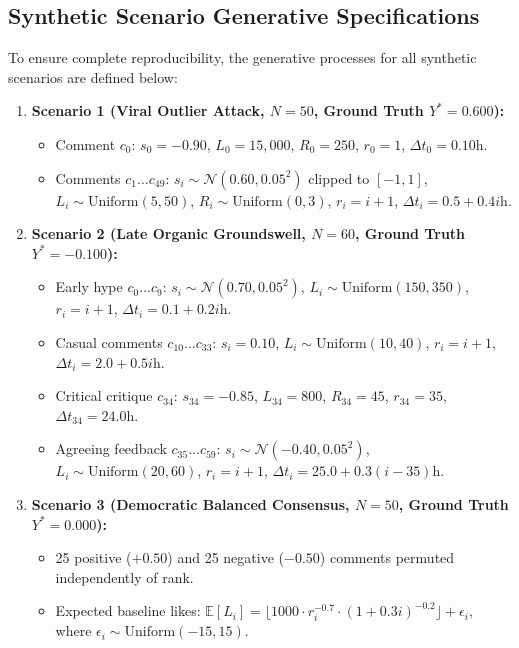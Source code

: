 \documentclass[journal]{IEEEtran}
\begin{document}
\subsection{Synthetic Scenario Generative Specifications}
To ensure complete reproducibility, the generative processes for all synthetic scenarios are defined below:
\begin{enumerate}
    \item \textbf{Scenario 1 (Viral Outlier Attack, $N = 50$, Ground Truth $Y^* = 0.600$):}
    \begin{itemize}
        \item Comment $c_0$: $s_0 = -0.90$, $L_0 = 15,000$, $R_0 = 250$, $r_0 = 1$, $\Delta t_0 = 0.10\text{h}$.
        \item Comments $c_1 \dots c_{49}$: $s_i \sim \mathcal{N}(0.60, 0.05^2)$ clipped to $[-1, 1]$, $L_i \sim \text{Uniform}(5, 50)$, $R_i \sim \text{Uniform}(0, 3)$, $r_i = i + 1$, $\Delta t_i = 0.5 + 0.4i\text{h}$.
    \end{itemize}
    \item \textbf{Scenario 2 (Late Organic Groundswell, $N = 60$, Ground Truth $Y^* = -0.100$):}
    \begin{itemize}
        \item Early hype $c_0 \dots c_9$: $s_i \sim \mathcal{N}(0.70, 0.05^2)$, $L_i \sim \text{Uniform}(150, 350)$, $r_i = i + 1$, $\Delta t_i = 0.1 + 0.2i\text{h}$.
        \item Casual comments $c_{10} \dots c_{33}$: $s_i = 0.10$, $L_i \sim \text{Uniform}(10, 40)$, $r_i = i + 1$, $\Delta t_i = 2.0 + 0.5i\text{h}$.
        \item Critical critique $c_{34}$: $s_{34} = -0.85$, $L_{34} = 800$, $R_{34} = 45$, $r_{34} = 35$, $\Delta t_{34} = 24.0\text{h}$.
        \item Agreeing feedback $c_{35} \dots c_{59}$: $s_i \sim \mathcal{N}(-0.40, 0.05^2)$, $L_i \sim \text{Uniform}(20, 60)$, $r_i = i + 1$, $\Delta t_i = 25.0 + 0.3(i - 35)\text{h}$.
    \end{itemize}
    \item \textbf{Scenario 3 (Democratic Balanced Consensus, $N = 50$, Ground Truth $Y^* = 0.000$):}
    \begin{itemize}
        \item 25 positive ($+0.50$) and 25 negative ($-0.50$) comments permuted independently of rank.
        \item Expected baseline likes: $\mathbb{E}[L_i] = \lfloor 1000 \cdot r_i^{-0.7} \cdot (1 + 0.3i)^{-0.2} \rfloor + \epsilon_i$, where $\epsilon_i \sim \text{Uniform}(-15, 15)$.
    \end{itemize}
\end{enumerate}
\end{document}
